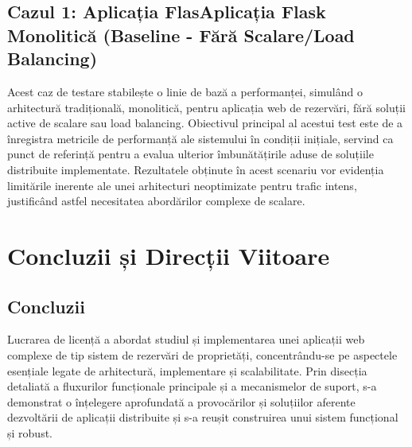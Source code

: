 \documentclass[12pt, a4paper, oneside, romanian]{teza-upb}
\begin{document}
\section{Cazul 1: Aplicația Flas\textbf{Aplicația Flask Monolitică} (Baseline - Fără Scalare/Load Balancing)}

Acest caz de testare stabilește o linie de bază a performanței, simulând o arhitectură tradițională, monolitică, pentru aplicația web de rezervări, fără soluții active de scalare sau load balancing. Obiectivul principal al acestui test este de a înregistra metricile de performanță ale sistemului în condiții inițiale, servind ca punct de referință pentru a evalua ulterior îmbunătățirile aduse de soluțiile distribuite implementate. Rezultatele obținute în acest scenariu vor evidenția limitările inerente ale unei arhitecturi neoptimizate pentru trafic intens, justificând astfel necesitatea abordărilor complexe de scalare.





\chapter{Concluzii și Direcții Viitoare}

\section{Concluzii}
Lucrarea de licență a abordat studiul și implementarea unei aplicații web complexe de tip sistem de rezervări de proprietăți, concentrându-se pe aspectele esențiale legate de arhitectură, implementare și scalabilitate. Prin disecția detaliată a fluxurilor funcționale principale și a mecanismelor de suport, s-a demonstrat o înțelegere aprofundată a provocărilor și soluțiilor aferente dezvoltării de aplicații distribuite și s-a reușit construirea unui sistem funcțional și robust.
\end{document}
